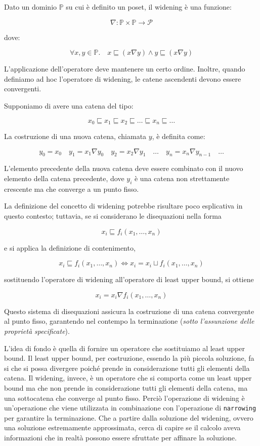 Dato un dominio $\mathbb{P}$ su cui è definito un poset, il widening è una funzione:

\[
\nabla : \mathbb{P} \times \mathbb{P} \rightarrow \mathcal{P}
\]

dove:

\[
\forall x,y \in \mathbb{P} . \quad x \sqsubseteq (x \nabla y) \land y \sqsubseteq (x \nabla y)
\]

L'applicazione dell'operatore deve mantenere un certo ordine. Inoltre, quando definiamo
ad hoc l'operatore di widening, le catene ascendenti devono essere convergenti.

Supponiamo di avere una catena del tipo:

\[
x_0 \sqsubseteq x_1 \sqsubseteq x_2 \sqsubseteq \dots \sqsubseteq x_n \sqsubseteq \dots
\]

La costruzione di una nuova catena, chiamata $y$, è definita come:

\[
y_0 = x_0 \quad y_1 = x_1 \nabla y_0 \quad y_{2} = x_2 \nabla y_1 \quad \dots \quad y_n
= x_n \nabla y_{n-1} \quad \dots
\]

L'elemento precedente della nuova catena deve essere combinato con il nuovo elemento della
catena precedente, dove $y_i$ è una catena non strettamente crescente ma che converge a
un punto fisso.

La definizione del concetto di widening potrebbe risultare poco esplicativa in questo
contesto; tuttavia, se si considerano le disequazioni nella forma

\[
  x_i \sqsubseteq f_i(x_1, \dots, x_n)
\]

e si applica la definizione di contenimento,

\[
  x_i \sqsubseteq f_i(x_1, \dots, x_n) \iff x_i = x_i \sqcup f_i(x_1, \dots, x_n)  
\]

sostituendo l'operatore di widening all'operatore di least upper bound, si ottiene

\begin{equation}
    x_i = x_i \nabla f_i(x_1, \dots, x_n)
\end{equation}

Questo sistema di disequazioni assicura la costruzione di una catena convergente al punto fisso,
garantendo nel contempo la terminazione (\textit{sotto l'assunzione delle proprietà specificate}).

L'idea di fondo è quella di fornire un operatore che sostituiamo al least upper bound. 
Il least upper bound, per costruzione, essendo la più piccola soluzione, fa si che si 
possa divergere poiché prende in considerazione tutti gli elementi della catena.
Il widening, invece, è un operatore che si comporta come un least upper bound ma che
non prende in considerazione tutti gli elementi della catena, ma una sottocatena 
che converge al punto fisso.
Perciò l'operazione di widening è un'operazione che viene utilizzata in combinazione 
con l'operazione di \texttt{narrowing} per garantire la terminazione. Che a partire 
dalla soluzione del widening, ovvero una soluzione estremamente approssimata, 
cerca di capire se il calcolo aveva informazioni che in realtà possono essere
sfruttate per affinare la soluzione. 
